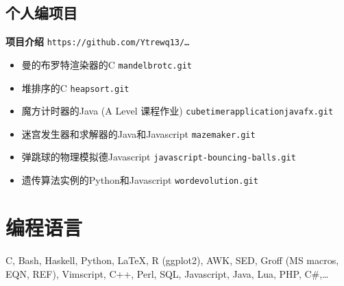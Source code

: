 \documentclass[10pt]{extarticle}
\begin{document}
    \subsection{个人编项目} %
        \hspace{1em} \textbf{项目介绍} %
        \hfill
        \texttt{https://github.com/Ytrewq13/\ldots}
        \begin{itemize}
            \item 曼的布罗特渲染器的C
                \hfill
                \texttt{mandelbrotc.git}
            \item 堆排序的C
                \hfill
                \texttt{heapsort.git}
            \item 魔方计时器的Java
                \hfill
                (A Level 课程作业)
                \hfill
                \texttt{cubetimerapplicationjavafx.git}
            \item 迷宫发生器和求解器的Java和Javascript
                \hfill
                \texttt{mazemaker.git}
            \item 弹跳球的物理模拟德Javascript
                \hfill
                \texttt{javascript-bouncing-balls.git}
            \item 遗传算法实例的Python和Javascript
                \hfill
                \texttt{wordevolution.git}
        \end{itemize}
\section{编程语言} %
    C,
    Bash,
    Haskell,
    Python,
    \LaTeX,
    R (ggplot2),
    AWK,
    SED,
    Groff (MS macros, EQN, REF),
    Vimscript,
    C++,
    Perl,
    SQL,
    Javascript,
    Java,
    Lua,
    PHP,
    C\#,\ldots
\end{document}
